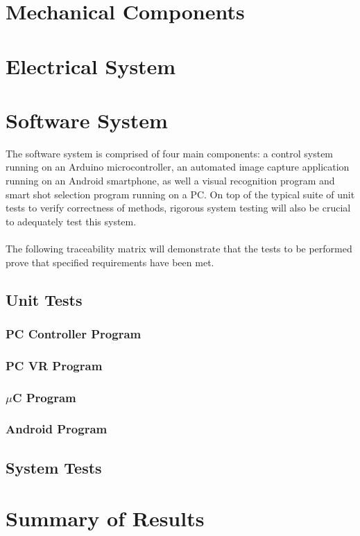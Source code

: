 \documentclass[titlepage]{article}
\begin{document}
\section{Mechanical Components}


\section{Electrical System}

\section{Software System}
The software system is comprised of four main components: a control system running on an Arduino microcontroller, an automated image capture application running on an Android smartphone, as well a visual recognition program and smart shot selection program running on a PC. On top of the typical suite of unit tests to verify correctness of methods, rigorous system testing will also be crucial to adequately test this system.\\~\\
The following traceability matrix will demonstrate that the tests to be performed prove that specified requirements have been met.
\subsection{Unit Tests}
\subsubsection{PC Controller Program}
\subsubsection{PC VR Program}
\subsubsection{$\mu$C Program}
\subsubsection{Android Program}
\subsection{System Tests}

\section{Summary of Results}
\end{document}
